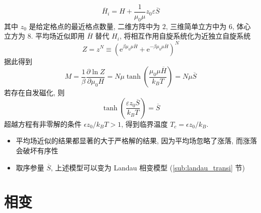 \documentclass[12pt,a4paper]{article}%
\numberwithin{equation}{section}
\newcommand\e{\mathrm{e}}%
\begin{document}
\begin{enumerate}
\begin{equation}
        \overline H_i = H + \frac 1{\mu_0\mu}z_0\varepsilon \overline S
    \end{equation}
    其中 $z_0$ 是给定格点的最近格点数量, 二维方阵中为 $2$, 三维简单立方中为 $6$, 体心立方为 $8$. 平均场近似即用 $\overline H$ 替代 $H_i$, 将相互作用自旋系统化为近独立自旋系统
    \begin{equation}
        Z = z^N \equiv \left(\e^{\beta\mu_0\mu\overline H} + \e^{-\beta\mu_0\mu\overline H}\right)^N
    \end{equation}
    据此得到 
    \begin{equation}
        M = \frac 1\beta\frac{\partial\ln Z}{\partial\mu_0 H} = N\mu\tanh\left(\frac{\mu_0\mu\overline H}{k_BT}\right) = N\mu\overline S
    \end{equation}
    若存在自发磁化, 则
    \begin{equation}
        \tanh\left(\frac{\varepsilon z_0\overline S}{k_BT}\right) = \overline S
    \end{equation}
    超越方程有非零解的条件 $\epsilon z_0/k_BT > 1$, 得到临界温度 $T_c = \epsilon z_0/k_B$. 
    \begin{itemize}
        \item 平均场近似的结果都显著的大于严格解的结果, 因为平均场忽略了涨落, 而涨落会破坏有序性
        \item  取序参量 $\overline S$, 上述模型可以变为 Landau 相变模型 (\ref{sub:landau_transi} 节)
    \end{itemize}
\end{enumerate}

\section{相变} %
\label{sec:phase_transition}
\end{document}
